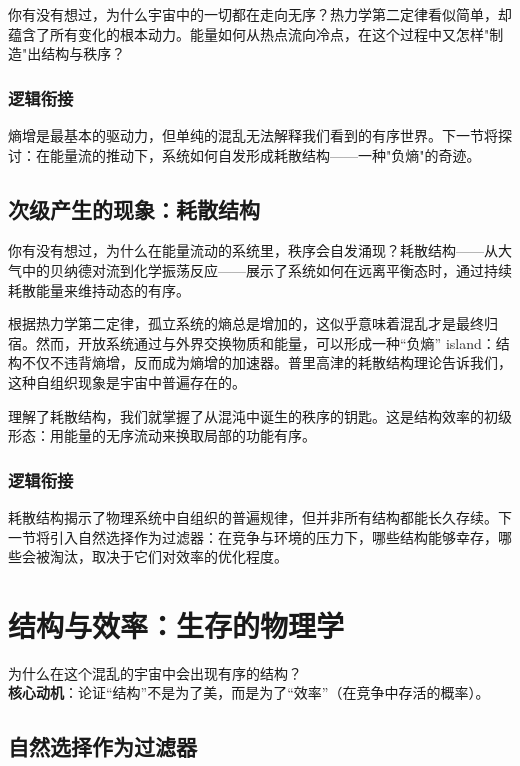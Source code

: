 \documentclass[openany, a4paper, 12pt]{book}
\newenvironment{motivation}{
	\vspace{0.5em}
	\begin{tcolorbox}[
		colback=gray!10,           %
		colframe=gray!60,          %
		title=\textit{本章动机 (Motivation)},
		fonttitle=\bfseries,
		arc=0mm,                   %
		leftrule=3mm               %
		]
		\small \itshape %
	}{
	\end{tcolorbox}
	\vspace{1em}
}
\begin{document}
	你有没有想过，为什么宇宙中的一切都在走向无序？热力学第二定律看似简单，却蕴含了所有变化的根本动力。能量如何从热点流向冷点，在这个过程中又怎样"制造"出结构与秩序？
	
	\subsection{逻辑衔接}
	熵增是最基本的驱动力，但单纯的混乱无法解释我们看到的有序世界。下一节将探讨：在能量流的推动下，系统如何自发形成耗散结构——一种"负熵"的奇迹。
	
	\section{次级产生的现象：耗散结构}
	
	你有没有想过，为什么在能量流动的系统里，秩序会自发涌现？耗散结构——从大气中的贝纳德对流到化学振荡反应——展示了系统如何在远离平衡态时，通过持续耗散能量来维持动态的有序。
	
	根据热力学第二定律，孤立系统的熵总是增加的，这似乎意味着混乱才是最终归宿。然而，开放系统通过与外界交换物质和能量，可以形成一种“负熵” island：结构不仅不违背熵增，反而成为熵增的加速器。普里高津的耗散结构理论告诉我们，这种自组织现象是宇宙中普遍存在的。
	
	理解了耗散结构，我们就掌握了从混沌中诞生的秩序的钥匙。这是结构效率的初级形态：用能量的无序流动来换取局部的功能有序。
	
	\subsection{逻辑衔接}
	耗散结构揭示了物理系统中自组织的普遍规律，但并非所有结构都能长久存续。下一节将引入自然选择作为过滤器：在竞争与环境的压力下，哪些结构能够幸存，哪些会被淘汰，取决于它们对效率的优化程度。
	
	\chapter{结构与效率：生存的物理学}
	\begin{motivation}
		为什么在这个混乱的宇宙中会出现有序的结构？\\
		\textbf{核心动机}：论证“结构”不是为了美，而是为了“效率”（在竞争中存活的概率）。
	\end{motivation}
	
	\section{自然选择作为过滤器}
	
\end{document}
